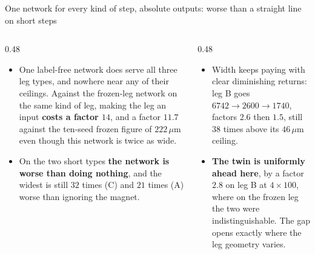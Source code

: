 \documentclass[aspectratio=169,10pt]{beamer}
\newcommand{\um}{\ensuremath{\,\mu\mathrm{m}}}
\newcommand{\hl}[1]{{\color{accent}\textbf{#1}}}
\newcommand{\bad}[1]{{\color{warm}\textbf{#1}}}
\begin{document}
\begin{frame}[shrink=25]{One network for every kind of step, absolute outputs: worse than a straight line on short steps}
  \begin{columns}[T]
    \begin{column}{0.48\textwidth}
      {\small
      \begin{itemize}\small
        \item One label-free network does serve all three leg types, and nowhere
              near any of their ceilings. Against the frozen-leg network on the
              same kind of leg, making the leg an input \hl{costs a factor
              $14$}, and a factor $11.7$ against the ten-seed frozen figure of
              $222\um$ even though this network is twice as wide.
        \item On the two short types \bad{the network is worse than doing
              nothing}, and the widest is still $32$ times (C) and $21$ times
              (A) worse than ignoring the magnet.
      \end{itemize}}
    \end{column}
    \begin{column}{0.48\textwidth}
      {\small
      \begin{itemize}\small
        \item Width keeps paying with clear diminishing returns: leg B goes
              $6742 \to 2600 \to 1740$, factors $2.6$ then $1.5$, still $38$
              times above its $46\um$ ceiling.
        \item \hl{The twin is uniformly ahead here}, by a factor $2.8$ on leg B
              at $4\times100$, where on the frozen leg the two were
              indistinguishable. The gap opens exactly where the leg geometry
              varies.
      \end{itemize}}
    \end{column}
  \end{columns}
\end{frame}
\end{document}
